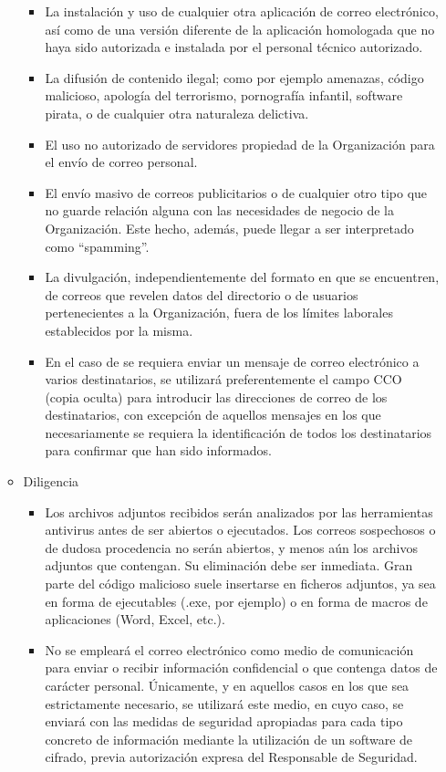 \begin{enumerate}[label=\alph*)]
\begin{itemize}
    \begin{itemize}
        \item La instalación y uso de cualquier otra aplicación de correo electrónico, así como de una versión diferente de la aplicación homologada que no haya sido autorizada e instalada por el personal técnico autorizado.
        \item La difusión de contenido ilegal; como por ejemplo amenazas, código malicioso, apología del terrorismo, pornografía infantil, software pirata, o de cualquier otra naturaleza delictiva.
        \item El uso no autorizado de servidores propiedad de la Organización para el envío de correo personal.
        \item El envío masivo de correos publicitarios o de cualquier otro tipo que no guarde relación alguna con las necesidades de negocio de la Organización. Este hecho, además, puede llegar a ser interpretado como “spamming”.
        \item La divulgación, independientemente del formato en que se encuentren, de correos que revelen datos del directorio o de usuarios pertenecientes a la Organización, fuera de los límites laborales establecidos por la misma.
        \item En el caso de se requiera enviar un mensaje de correo electrónico a varios destinatarios, se utilizará preferentemente el campo CCO (copia oculta) para introducir las direcciones de correo de los destinatarios, con excepción de aquellos mensajes en los que necesariamente se requiera la identificación de todos los destinatarios para confirmar que han sido informados.
    \end{itemize}
    \item Diligencia
    \begin{itemize}
        \item Los archivos adjuntos recibidos serán analizados por las herramientas antivirus antes de ser abiertos o ejecutados. Los correos sospechosos o de dudosa procedencia no serán abiertos, y menos aún los archivos adjuntos que contengan. Su eliminación debe ser inmediata. Gran parte del código malicioso suele insertarse en ficheros adjuntos, ya sea en forma de ejecutables (.exe, por ejemplo) o en forma de macros de aplicaciones (Word, Excel, etc.).
        \item No se empleará el correo electrónico como medio de comunicación para enviar o recibir información confidencial o que contenga datos de carácter personal. Únicamente, y en aquellos casos en los que sea estrictamente necesario, se utilizará este medio, en cuyo caso, se enviará con las medidas de seguridad apropiadas para cada tipo concreto de información mediante la utilización de un software de cifrado, previa autorización expresa del Responsable de Seguridad.

\end{itemize}
\end{itemize}
\end{enumerate}
